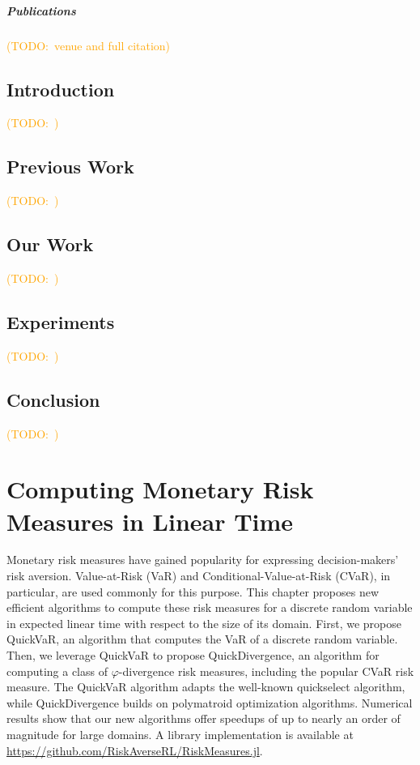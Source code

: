 \documentclass[12pt,letterpaper,oneside]{report}
\theoremstyle{plain}
\theoremstyle{definition}
\theoremstyle{remark}
\newcommand{\todo}[1]{\textcolor{orange}{(TODO:\ #1)}}
\begin{document}
\paragraph{Publications} \todo{venue and full citation}

\section{Introduction}\label{sec:roil-intro}

\todo{}

\section{Previous Work}\label{sec:roil-prior}

\todo{}

\section{Our Work}\label{sec:roil-ours}

\todo{}

\section{Experiments}\label{sec:roil-experiments}

\todo{}

\section{Conclusion}\label{sec:roil-conclusion}

\todo{}

\chapter{Computing Monetary Risk Measures in Linear Time}\label{ch:fast-risk}

Monetary risk measures have gained popularity for expressing decision-makers' risk aversion. Value-at-Risk (VaR) and Conditional-Value-at-Risk (CVaR), in particular, are used commonly for this purpose. This chapter proposes new efficient algorithms to compute these risk measures for a discrete random variable in expected linear time with respect to the size of its domain. First, we propose QuickVaR, an algorithm that computes the VaR of a discrete random variable. Then, we leverage QuickVaR to propose QuickDivergence, an algorithm for computing a class of $\varphi$-divergence risk measures, including the popular CVaR risk measure. The QuickVaR algorithm adapts the well-known quickselect algorithm, while QuickDivergence builds on polymatroid optimization algorithms. Numerical results show that our new algorithms offer speedups of up to nearly an order of magnitude for large domains. A library implementation is available at \url{https://github.com/RiskAverseRL/RiskMeasures.jl}.
\end{document}
